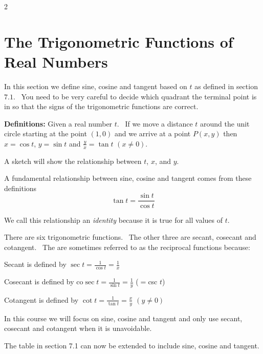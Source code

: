 \columnsep =30pt
\begin {multicols}{2}
 


\end {multicols}

\section{The Trigonometric Functions of Real Numbers}
In this section we define sine, cosine and tangent based on $t$ as defined in section $7.1$. \ You need to be very careful to decide which quadrant the terminal point is in
so that the signs of the trigonometric functions are correct. 

\textbf{Definitions:} Given a real number $t$. \ If we move a distance $t$ around the unit circle starting at the point $\left (1 ,0\right )$ and we arrive at a point $P (x ,y)$ then $x =\cos  t$, $y =\sin  t$ and $\frac{y}{x} =\tan  t$ $\left (x \neq 0\right )$. 

A sketch will show the relationship between
$t$, $x$, and $y$. 

A fundamental relationship between sine, cosine and tangent comes from these definitions
\begin{equation*}\tan  t =\frac{\sin  t}{\cos  t}
\end{equation*}

We call this relationship an \emph{identity} because it is true for all values
of $t$. 

There are six trigonometric functions. \ The other three are
secant, cosecant and cotangent. \ The are sometimes referred to as the reciprocal functions because: 

Secant is defined by $\sec  t =\frac{1}{\cos  t} =\frac{1}{x}$ 

Cosecant is defined by co$\sec  t =\frac{1}{\sin  t} =\frac{1}{y}$ ($ =$csc $t$) 

Cotangent is defined by $\cot  t =\frac{1}{\tan  t} =\frac{x}{y}$ $\left (y \neq 0\right )$ 

In this course we will focus on sine, cosine
and tangent and only use secant, cosecant and cotangent when it is unavoidable. 

The table in section 7.1 can now be extended to include
sine, cosine and tangent. 

